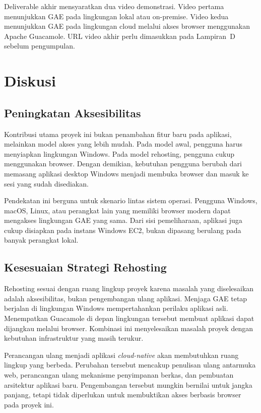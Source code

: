 \documentclass[conference]{IEEEtran}
\begin{document}
Deliverable akhir mensyaratkan dua video demonstrasi. Video pertama menunjukkan GAE pada lingkungan lokal atau on-premise. Video kedua menunjukkan GAE pada lingkungan cloud melalui akses browser menggunakan Apache Guacamole. URL video akhir perlu dimasukkan pada Lampiran~D sebelum pengumpulan.

\section{Diskusi}

\subsection{Peningkatan Aksesibilitas}

Kontribusi utama proyek ini bukan penambahan fitur baru pada aplikasi, melainkan model akses yang lebih mudah. Pada model awal, pengguna harus menyiapkan lingkungan Windows. Pada model rehosting, pengguna cukup menggunakan browser. Dengan demikian, kebutuhan pengguna berubah dari memasang aplikasi desktop Windows menjadi membuka browser dan masuk ke sesi yang sudah disediakan.

Pendekatan ini berguna untuk skenario lintas sistem operasi. Pengguna Windows, macOS, Linux, atau perangkat lain yang memiliki browser modern dapat mengakses lingkungan GAE yang sama. Dari sisi pemeliharaan, aplikasi juga cukup disiapkan pada instans Windows EC2, bukan dipasang berulang pada banyak perangkat lokal.

\subsection{Kesesuaian Strategi Rehosting}

Rehosting sesuai dengan ruang lingkup proyek karena masalah yang diselesaikan adalah aksesibilitas, bukan pengembangan ulang aplikasi. Menjaga GAE tetap berjalan di lingkungan Windows mempertahankan perilaku aplikasi asli. Menempatkan Guacamole di depan lingkungan tersebut membuat aplikasi dapat dijangkau melalui browser. Kombinasi ini menyelesaikan masalah proyek dengan kebutuhan infrastruktur yang masih terukur.

Perancangan ulang menjadi aplikasi \textit{cloud-native} akan membutuhkan ruang lingkup yang berbeda. Perubahan tersebut mencakup penulisan ulang antarmuka web, perancangan ulang mekanisme penyimpanan berkas, dan pembuatan arsitektur aplikasi baru. Pengembangan tersebut mungkin bernilai untuk jangka panjang, tetapi tidak diperlukan untuk membuktikan akses berbasis browser pada proyek ini.
\end{document}
